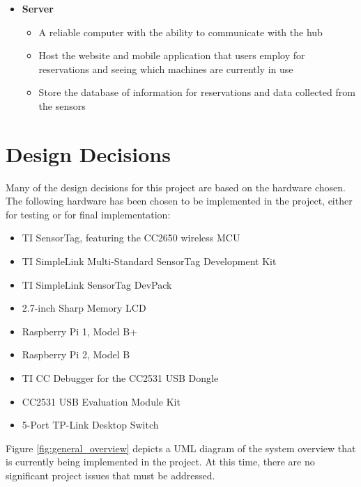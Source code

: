 \documentclass[letterpaper,11pt]{./templates/texMemo} %
\begin{document}
\begin{itemize}
    \item{\textbf{Server}}
    \begin{itemize}
        \item{A reliable computer with the ability to communicate with the hub}
        \item{Host the website and mobile application that users employ for reservations and seeing which machines are currently in use}
        \item{Store the database of information for reservations and data collected from the sensors}
    \end{itemize}
    \end{itemize}

\section{Design Decisions}
Many of the design decisions for this project are based on the hardware chosen. The following hardware has been chosen to be implemented in the project, either for testing or for final implementation:
\begin{itemize}
\item{TI SensorTag, featuring the CC2650 wireless MCU}
\item{TI SimpleLink Multi-Standard SensorTag Development Kit}
\item{TI SimpleLink SensorTag DevPack}
\item{2.7-inch Sharp Memory LCD}
\item{Raspberry Pi 1, Model B+}
\item{Raspberry Pi 2, Model B}
\item{TI CC Debugger for the CC2531 USB Dongle}
\item{CC2531 USB Evaluation Module Kit}
\item{5-Port TP-Link Desktop Switch}
\end{itemize}

Figure \ref{fig:general_overview} depicts a UML diagram of the system overview that is currently being implemented in the project. At this time, there are no significant project issues that must be addressed.
\end{document}
